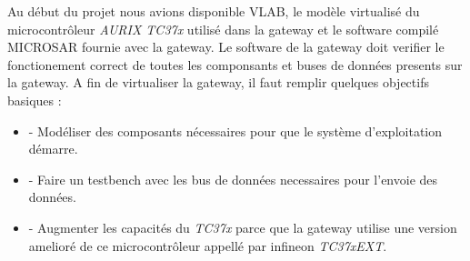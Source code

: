 
Au début du projet nous avions disponible VLAB, le mod\`ele virtualis\'e du microcontr\^oleur \textit{AURIX TC37x} utilis\'e dans la gateway et le software compil\'e MICROSAR fournie avec la gateway. Le software de la gateway doit verifier le fonctionement correct de toutes les componsants et buses de donn\'ees presents sur la gateway. A fin de virtualiser la gateway, il faut remplir quelques objectifs basiques : 
\begin{itemize}
    \item - Modéliser des composants nécessaires pour que le syst\`eme d'exploitation démarre.
    \item - Faire un testbench avec les bus de donn\'ees necessaires pour l'envoie des donn\'ees.
    \item - Augmenter les capacit\'es du \textit{TC37x} parce que la gateway utilise une version amelior\'e de ce microcontr\^oleur appell\'e par infineon \textit{TC37xEXT}\cite{aurix.tc37e}.
\end{itemize}
